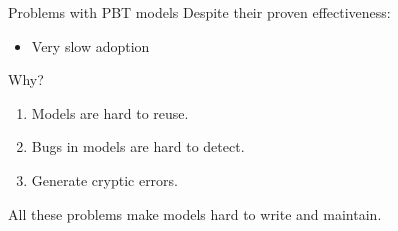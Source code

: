 \documentclass[aspectratio=169, 10pt]{beamer}
\begin{document}
\begin{frame}[label={sec:org12940b9}]{Problems with PBT models}
\onslide<+->
\onslide<+->
Despite their proven effectiveness:
\begin{itemize}
\item Very slow adoption
\end{itemize}

\vspace{10pt}
\onslide<+->
Why?

\vspace{10pt}

\begin{enumerate}
\item Models are hard to reuse.
\item Bugs in models are hard to detect.
\item Generate cryptic errors.
\end{enumerate}
\onslide<+->
\vspace{10pt}

All these problems make models hard to write and maintain.
\end{frame}
\end{document}

